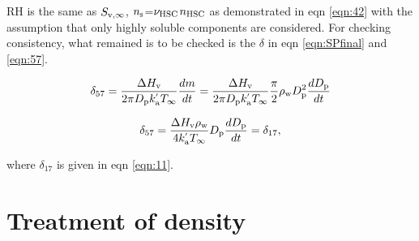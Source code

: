 \documentclass[12pt]{article}
\begin{document}
RH is the same as $S_{\rm v, \infty}$, $n_{\rm s}$=$\nu_{\rm HSC}$$n_{\rm HSC}$ as demonstrated in eqn \ref{eqn:42} with the assumption that only highly soluble components are considered. For checking consistency, what remained is to be checked is the $\delta$ in eqn \ref{eqn:SPfinal} and \ref{eqn:57}. 


\begin{equation}\label{eqn:59}
\delta_{57}=\frac{\Delta H_{\rm v}}{2 \pi D_{\rm p} k^{'}_{\rm a} T_{\infty}} \frac{dm}{dt}
=\frac{\Delta H_{\rm v}}{2 \pi D_{\rm p} k^{'}_{\rm a} T_{\infty}} \frac{\pi}{2}\rho_{\rm w}D_{\rm p}^{2}\frac{dD_{\rm p}}{dt}
\end{equation}


\begin{equation}\label{eqn:60}
\delta_{57}=\frac{\Delta H_{\rm v} \rho_{\rm w}}{4 k^{'}_{\rm a} T_{\infty}} D_{\rm p}\frac{dD_{\rm p}}{dt}=\delta_{17},
\end{equation}

where $\delta_{17}$ is given in eqn \ref{eqn:11}.

\section{Treatment of density}
\end{document}
